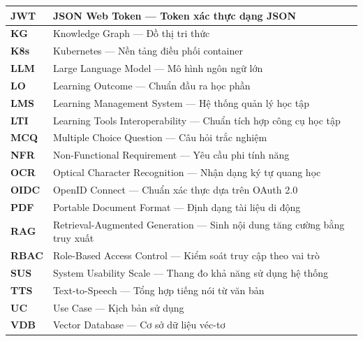 \begin{longtable}{|p{3.5cm}|p{11cm}|}
    \hline
    \textbf{JWT}     & JSON Web Token --- Token xác thực dạng JSON \\
    \hline
    \textbf{KG}      & Knowledge Graph --- Đồ thị tri thức \\
    \hline
    \textbf{K8s}     & Kubernetes --- Nền tảng điều phối container \\
    \hline
    \textbf{LLM}     & Large Language Model --- Mô hình ngôn ngữ lớn \\
    \hline
    \textbf{LO}      & Learning Outcome --- Chuẩn đầu ra học phần \\
    \hline
    \textbf{LMS}     & Learning Management System --- Hệ thống quản lý học tập \\
    \hline
    \textbf{LTI}     & Learning Tools Interoperability --- Chuẩn tích hợp công cụ học tập \\
    \hline
    \textbf{MCQ}     & Multiple Choice Question --- Câu hỏi trắc nghiệm \\
    \hline
    \textbf{NFR}     & Non-Functional Requirement --- Yêu cầu phi tính năng \\
    \hline
    \textbf{OCR}     & Optical Character Recognition --- Nhận dạng ký tự quang học \\
    \hline
    \textbf{OIDC}    & OpenID Connect --- Chuẩn xác thực dựa trên OAuth 2.0 \\
    \hline
    \textbf{PDF}     & Portable Document Format --- Định dạng tài liệu di động \\
    \hline
    \textbf{RAG}     & Retrieval-Augmented Generation --- Sinh nội dung tăng cường bằng truy xuất \\
    \hline
    \textbf{RBAC}    & Role-Based Access Control --- Kiểm soát truy cập theo vai trò \\
    \hline
    \textbf{SUS}     & System Usability Scale --- Thang đo khả năng sử dụng hệ thống \\
    \hline
    \textbf{TTS}     & Text-to-Speech --- Tổng hợp tiếng nói từ văn bản \\
    \hline
    \textbf{UC}      & Use Case --- Kịch bản sử dụng \\
    \hline
    \textbf{VDB}     & Vector Database --- Cơ sở dữ liệu véc-tơ \\
    \hline

\end{longtable}
